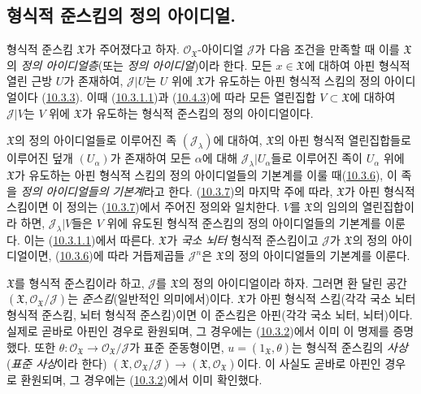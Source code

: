 \subsection{형식적 준스킴의 정의 아이디얼.}
\label{subsection:I.10.5-ko}

\begin{env}[10.5.1]
\label{I.10.5.1-ko}
형식적 준스킴 $\mathfrak{X}$가 주어졌다고 하자.
$\mathscr{O}_{\mathfrak{X}}$-아이디얼 $\mathscr{J}$가 다음 조건을 만족할
때 이를 $\mathfrak{X}$의 \emph{정의 아이디얼층}(또는
\emph{정의 아이디얼})이라 한다. 모든 $x\in\mathfrak{X}$에 대하여 아핀
형식적 열린 근방 $U$가 존재하여, $\mathscr{J}|U$는 $U$ 위에
$\mathfrak{X}$가 유도하는 아핀 형식적 스킴의 정의 아이디얼이다
(\hyperref[I.10.3.3-ko]{10.3.3}). 이때
(\hyperref[I.10.3.1.1-ko]{10.3.1.1})과
(\hyperref[I.10.4.3-ko]{10.4.3})에 따라 모든 열린집합
$V\subset\mathfrak{X}$에 대하여 $\mathscr{J}|V$는 $V$ 위에
$\mathfrak{X}$가 유도하는 형식적 준스킴의 정의 아이디얼이다.

$\mathfrak{X}$의 정의 아이디얼들로 이루어진 족
$(\mathscr{J}_\lambda)$에 대하여, $\mathfrak{X}$의 아핀 형식적
열린집합들로 이루어진 덮개 $(U_\alpha)$가 존재하여 모든 $\alpha$에
대해 $\mathscr{J}_\lambda|U_\alpha$들로 이루어진 족이 $U_\alpha$ 위에
$\mathfrak{X}$가 유도하는 아핀 형식적 스킴의 정의 아이디얼들의
기본계를 이룰 때(\hyperref[I.10.3.6-ko]{10.3.6}), 이 족을
\emph{정의 아이디얼들의}
\emph{기본계}라고 한다. (\hyperref[I.10.3.7-ko]{10.3.7})의 마지막
주에 따라, $\mathfrak{X}$가 아핀 형식적 스킴이면 이 정의는
(\hyperref[I.10.3.7-ko]{10.3.7})에서 주어진 정의와 일치한다. $V$를
$\mathfrak{X}$의 임의의 열린집합이라 하면, $\mathscr{J}_\lambda|V$들은
$V$ 위에 유도된 형식적 준스킴의 정의 아이디얼들의 기본계를 이룬다. 이는
(\hyperref[I.10.3.1.1-ko]{10.3.1.1})에서 따른다. $\mathfrak{X}$가
\emph{국소 뇌터} 형식적 준스킴이고 $\mathscr{J}$가 $\mathfrak{X}$의
정의 아이디얼이면, (\hyperref[I.10.3.6-ko]{10.3.6})에 따라 거듭제곱들
$\mathscr{J}^n$은 $\mathfrak{X}$의 정의 아이디얼들의 기본계를 이룬다.
\end{env}

\begin{env}[10.5.2]
\label{I.10.5.2-ko}
$\mathfrak{X}$를 형식적 준스킴이라 하고, $\mathscr{J}$를
$\mathfrak{X}$의 정의 아이디얼이라 하자. 그러면 환 달린 공간
$(\mathfrak{X},\mathscr{O}_{\mathfrak{X}}/\mathscr{J})$는
\emph{준스킴}(일반적인 의미에서)이다. $\mathfrak{X}$가 아핀 형식적
스킴(각각 국소 뇌터 형식적 준스킴, 뇌터 형식적 준스킴)이면 이 준스킴은
아핀(각각 국소 뇌터, 뇌터)이다. 실제로 곧바로 아핀인 경우로 환원되며,
그 경우에는 (\hyperref[I.10.3.2-ko]{10.3.2})에서 이미 이 명제를
증명했다. 또한
$\theta:\mathscr{O}_{\mathfrak{X}}\to
\mathscr{O}_{\mathfrak{X}}/\mathscr{J}$가 표준 준동형이면,
$u=(1_{\mathfrak{X}},\theta)$는 형식적 준스킴의 \emph{사상}
(\emph{표준 사상}이라 한다)
$(\mathfrak{X},\mathscr{O}_{\mathfrak{X}}/\mathscr{J})\to
(\mathfrak{X},\mathscr{O}_{\mathfrak{X}})$이다. 이 사실도 곧바로 아핀인
경우로 환원되며, 그 경우에는
(\hyperref[I.10.3.2-ko]{10.3.2})에서 이미 확인했다.
\end{env}

